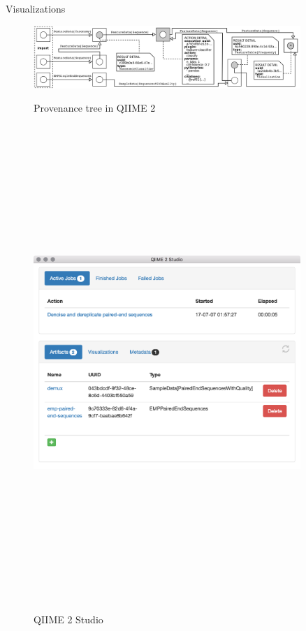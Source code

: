 \documentclass[final]{beamer}
\newlength{\sepwidth}
\newlength{\colwidth}
\newcommand{\separatorcolumn}{\begin{column}{\sepwidth}\end{column}}
\begin{document}
\begin{frame}[t]
\begin{columns}[t]
\begin{column}{\colwidth}
\end{column}

\separatorcolumn

\begin{column}{\colwidth}

  \begin{block}{Visualizations}
    \begin{figure}[tph!]
      {\includegraphics[width=\linewidth]{assets/provenance}}
      \caption{Provenance tree in QIIME 2}
    \end{figure}

    \begin{figure}[tph!]
      {\includegraphics[height=18cm]{assets/q2studio}}
      \caption{QIIME 2 Studio}
    \end{figure}


\end{block}
\end{column}
\end{columns}
\end{frame}
\end{document}
